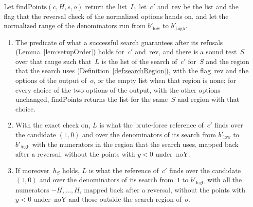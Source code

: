 \begin{lemma}\label{lem:findPointsList}
  \leanok
  Let $\mathrm{findPoints}(c, H, s, o)$ return the list~$L$, let~$c'$ and~$\mathrm{rev}$ be the list
  and the flag that the reversal check of the normalized options hands on, and let the normalized
  range of the denominators run from $b'_{\mathrm{low}}$ to $b'_{\mathrm{high}}$.
  \begin{enumerate}
    \item The predicate  of what a successful search guarantees
      after its refusals (Lemma~\ref{lem:setupOrder}) holds for~$c'$ and~$\mathrm{rev}$, and there
      is a sound test~$S$ over that range such that~$L$ is the list of the search of~$c'$ for~$S$
      and the region that the search uses (Definition~\ref{def:searchRegion}), with the
      flag~$\mathrm{rev}$ and the options of the output of~$o$, or the empty list when that region
      is none; for every choice of the two options of the output, with the other options unchanged,
      $\mathrm{findPoints}$ returns the list for the same~$S$ and region with that choice.
    \item With the exact check on, $L$ is what the brute-force reference of~$c'$ finds over the
      candidate $(1, 0)$ and over the denominators of its search from $b'_{\mathrm{low}}$ to
      $b'_{\mathrm{high}}$ with the numerators in the region that the search uses, mapped back after
      a reversal, without the points with $y < 0$ under~$\mathrm{noY}$.
    \item If moreover~$h_S$ holds, $L$ is what the reference of~$c'$ finds over the candidate
      $(1, 0)$ and over the denominators of its search from~$1$ to $b'_{\mathrm{high}}$ with all the
      numerators $-H, \dots, H$, mapped back after a reversal, without the points with $y < 0$
      under~$\mathrm{noY}$ and those outside the search region of~$o$.
  \end{enumerate}
\end{lemma}

